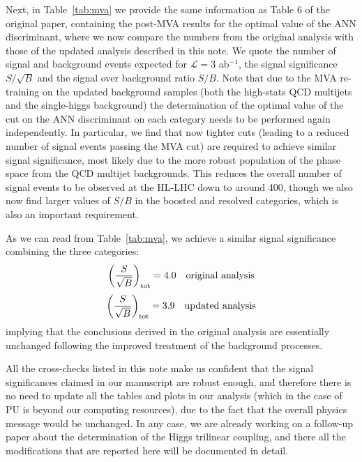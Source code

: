 \documentclass[11pt,a4paper]{article}
\newcommand{\be}{\begin{equation}}
\newcommand{\ee}{\end{equation}}
\newcommand{\lp}{\left(}
\newcommand{\rp}{\right)}
\def\frac#1#2{{{#1}\over {#2}}}
\begin{document}
%
Next, in Table~\ref{tab:mva} we provide the same
information as Table 6 of the original paper, containing the post-MVA
results for the optimal value of the
ANN discriminant, where we now compare the numbers from the original
analysis with those of the updated analysis described in this note.
    We quote the number of signal and
    background events expected for $\mathcal{L}=3$ ab$^{-1}$,
    the signal significance $S/\sqrt{B}$ and
    the signal over background ratio $S/B$.
    Note that due to the MVA re-training on the updated background samples
    (both the high-stats QCD multijets and the single-higgs background) the determination
    of the optimal value of the cut on the ANN discriminant on each category needs
    to be performed again independently.
    In particular, we find that now tighter cuts (leading to a reduced number
    of signal events passing the MVA cut) are
    required to achieve similar signal significance, most likely
    due to the more robust population of the phase space from the
    QCD multijet backgrounds.
    This reduces the overall number of signal events to be observed
    at the HL-LHC down to around 400, though we also now find larger values
    of $S/B$ in the boosted and resolved categories,
    which is also an important requirement.

    As we can read from Table~\ref{tab:mva}, we achieve a similar signal significance combining the three
    categories:
    \be
   \lp \frac{S}{\sqrt{B}}\rp_{\rm tot} = 4.0 \quad {\rm original~analysis}
   \ee
    \be
   \lp \frac{S}{\sqrt{B}}\rp_{\rm tot} = 3.9 \quad {\rm updated~analysis}
   \ee
   implying that the conclusions derived
   in the original analysis are essentially unchanged following the improved treatment
   of the background processes.

   All the cross-checks listed in this note
   make us confident that the signal significances claimed in our
   manuscript are robust enough, and therefore there is no need to update all the tables
   and plots in our analysis (which in the case of PU is beyond our computing resources),
   due to the fact that the overall physics message would be unchanged.
%
  In any case, we are already working on a follow-up paper about the determination of the Higgs trilinear coupling, and there all the modifications that are reported here will be documented in detail.
\end{document}
